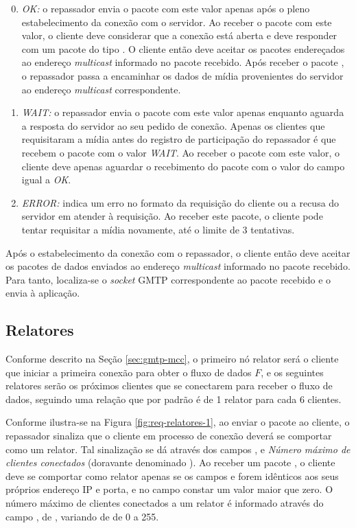 \begin{enumerate}
\setcounter{enumi}{-1}
\item \emph{OK:} o repassador envia o pacote  com este valor apenas após o pleno estabelecimento da conexão com o servidor. Ao receber o pacote com este valor, o cliente deve considerar que a conexão está aberta e deve responder com um pacote do tipo . O cliente então deve aceitar os pacotes endereçados ao endereço \textit{multicast} informado no pacote recebido. Após receber o pacote , o repassador passa a encaminhar os dados de mídia provenientes do servidor ao endereço \textit{multicast} correspondente. 
\item \emph{WAIT:} o repassador envia o pacote  com este valor apenas enquanto aguarda a resposta do servidor ao seu pedido de conexão. Apenas os clientes que requisitaram a mídia antes do registro de participação do repassador é que recebem o pacote com o valor \emph{WAIT}. Ao receber o pacote com este valor, o cliente deve apenas aguardar o recebimento do pacote  com o valor do campo  igual a \emph{OK}.
\item \emph{ERROR:} indica um erro no formato da requisição do cliente ou a recusa do servidor em atender à requisição. Ao receber este pacote, o cliente pode tentar requisitar a mídia novamente, até o limite de 3 tentativas.
\end{enumerate}

Após o estabelecimento da conexão com o repassador, o cliente então deve aceitar os pacotes de dados enviados ao endereço \textit{multicast} informado no pacote  recebido. Para tanto, localiza-se o \textit{socket} GMTP correspondente ao pacote recebido e o envia à aplicação.

\subsection{Relatores}
\label{sec:relatores}

Conforme descrito na Seção \ref{sec:gmtp-mcc}, o primeiro nó relator será o cliente que iniciar a primeira conexão para obter o fluxo de dados $F$, e os seguintes relatores serão os próximos clientes que se conectarem para receber o fluxo de dados, seguindo uma relação que por padrão é de 1 relator para cada 6 clientes.

Conforme ilustra-se na Figura \ref{fig:req-relatores-1}, ao enviar o pacote  ao cliente, o repassador sinaliza que o cliente em processo de conexão deverá se comportar como um relator. Tal sinalização se dá através dos campos ,  e \textit{Número máximo de clientes conectados} (doravante denominado ).
Ao receber um pacote , o cliente deve se comportar como relator apenas se os campos  e  forem idênticos aos seus próprios endereço IP e porta, e no campo  constar um valor maior que zero.
O número máximo de clientes conectados a um relator é informado através do campo , de , variando de de 0 a 255. 

